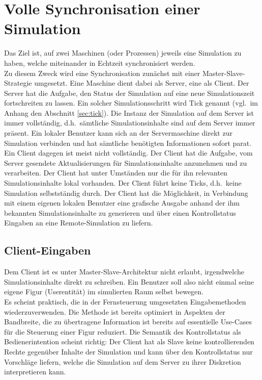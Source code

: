 \section{Volle Synchronisation einer Simulation}
Das Ziel ist, auf zwei Maschinen (oder Prozessen) jeweils eine Simulation zu haben, welche miteinander in Echtzeit synchronisiert werden.\\
Zu diesem Zweck wird eine Synchronisation zunächst mit einer Master-Slave-Strategie umgesetzt. Eine Maschine dient dabei als Server, eine als Client.
Der Server hat die Aufgabe, den Status der Simulation auf eine neue Simulationszeit fortschreiten zu lassen. Ein solcher Simulationsschritt wird Tick genannt (vgl.~im Anhang den Abschnitt \ref{sec:tick}). Die Instanz der Simulation auf dem Server ist immer vollständig, d.h.~sämtliche Simulationsinhalte sind auf dem Server immer präsent. Ein lokaler Benutzer kann sich an der Servermaschine direkt zur Simulation verbinden und hat sämtliche benötigten Informationen sofort parat.\\
Ein Client dagegen ist meist nicht vollständig. Der Client hat die Aufgabe, vom Server gesendete Aktualisierungen für Simulationsinhalte anzunehmen und zu verarbeiten. Der Client hat unter Umständen nur die für ihn relevanten Simulationsinhalte lokal vorhanden. Der Client führt keine Ticks, d.h.~keine Simulation selbstständig durch. Der Client hat die Möglichkeit, in Verbindung mit einem eigenen lokalen Benutzer eine grafische Ausgabe anhand der ihm bekannten Simulationsinhalte zu generieren und über einen Kontrollstatus Eingaben an eine Remote-Simulation zu liefern. 

\subsection{Client-Eingaben}
Dem Client ist es unter Master-Slave-Architektur nicht erlaubt, irgendwelche Simulationsinhalte direkt zu schreiben. Ein Benutzer soll also nicht einmal seine eigene Figur (Userentität) im simulierten Raum selbst bewegen.\\
Es scheint praktisch, die in der Fernsteuerung umgesetzten Eingabemethoden wiederzuverwenden. Die Methode ist bereits optimiert in Aspekten der Bandbreite, die zu übertragene Information ist bereits auf essentielle Use-Cases für die Steuerung einer Figur reduziert. Die Semantik des Kontrollstatus als Bedienerintention scheint richtig: Der Client hat als Slave keine kontrollierenden Rechte gegenüber Inhalte der Simulation und kann über den Kontrollstatus nur Vorschläge liefern, welche die Simulation auf dem Server zu ihrer Diskretion interpretieren kann.

